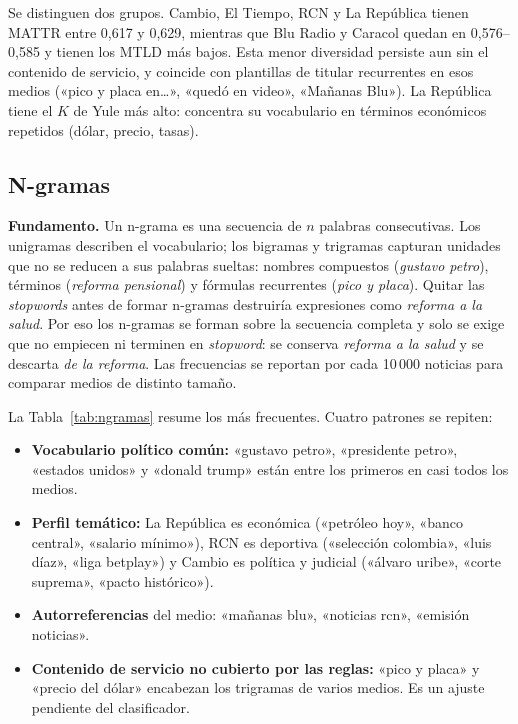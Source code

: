 \documentclass[10pt,twocolumn]{article}
\begin{document}
Se distinguen dos grupos. Cambio, El Tiempo, RCN y La República tienen MATTR
entre 0,617 y 0,629, mientras que Blu Radio y Caracol quedan en 0,576--0,585 y
tienen los MTLD más bajos. Esta menor diversidad persiste aun sin el contenido
de servicio, y coincide con plantillas de titular recurrentes en esos medios
(«pico y placa en\ldots», «quedó en video», «Mañanas Blu»). La República tiene
el $K$ de Yule más alto: concentra su vocabulario en términos económicos
repetidos (dólar, precio, tasas).

\subsection{N-gramas}

\textbf{Fundamento.} Un n-grama es una secuencia de $n$ palabras consecutivas.
Los unigramas describen el vocabulario; los bigramas y trigramas capturan
unidades que no se reducen a sus palabras sueltas: nombres compuestos
(\textit{gustavo petro}), términos (\textit{reforma pensional}) y fórmulas
recurrentes (\textit{pico y placa}). Quitar las \textit{stopwords} antes de
formar n-gramas destruiría expresiones como \textit{reforma a la salud}. Por
eso los n-gramas se forman sobre la secuencia completa y solo se exige que no
empiecen ni terminen en \textit{stopword}: se conserva \textit{reforma a la
salud} y se descarta \textit{de la reforma}. Las frecuencias se reportan por
cada 10\,000 noticias para comparar medios de distinto tamaño.

La Tabla~\ref{tab:ngramas} resume los más frecuentes. Cuatro
patrones se repiten:

\begin{itemize}
\item \textbf{Vocabulario político común:} «gustavo petro», «presidente petro»,
«estados unidos» y «donald trump» están entre los primeros en casi todos los
medios.
\item \textbf{Perfil temático:} La República es económica («petróleo hoy»,
«banco central», «salario mínimo»), RCN es deportiva («selección colombia»,
«luis díaz», «liga betplay») y Cambio es política y judicial («álvaro uribe»,
«corte suprema», «pacto histórico»).
\item \textbf{Autorreferencias} del medio: «mañanas blu», «noticias rcn»,
«emisión noticias».
\item \textbf{Contenido de servicio no cubierto por las reglas:} «pico y placa»
y «precio del dólar» encabezan los trigramas de varios medios. Es un ajuste
pendiente del clasificador.
\end{itemize}
\end{document}
